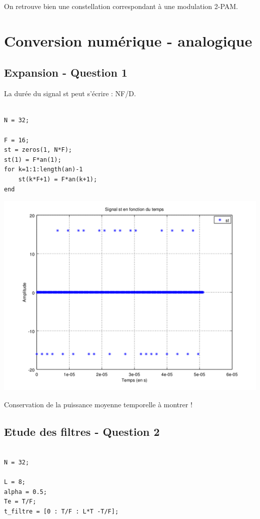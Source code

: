 \documentclass{acm_proc_article-sp}
\begin{document}
On retrouve bien une constellation correspondant à une modulation 2-PAM.

\section{Conversion numérique - analogique}
\subsection{Expansion - Question 1}

La durée du signal st peut s'écrire : NF/D.

\begin{center}
\begin{lstlisting}

N = 32;

F = 16;
st = zeros(1, N*F);
st(1) = F*an(1);
for k=1:1:length(an)-1
    st(k*F+1) = F*an(k+1);
end
\end{lstlisting}

\includegraphics[scale=0.45]{st_3.png}
\end{center}

Conservation de la puissance moyenne temporelle à montrer !

\subsection{Etude des filtres - Question 2}

\begin{lstlisting}

N = 32;

L = 8;
alpha = 0.5;
Te = T/F;
t_filtre = [0 : T/F : L*T -T/F];
\end{lstlisting}
\end{document}
